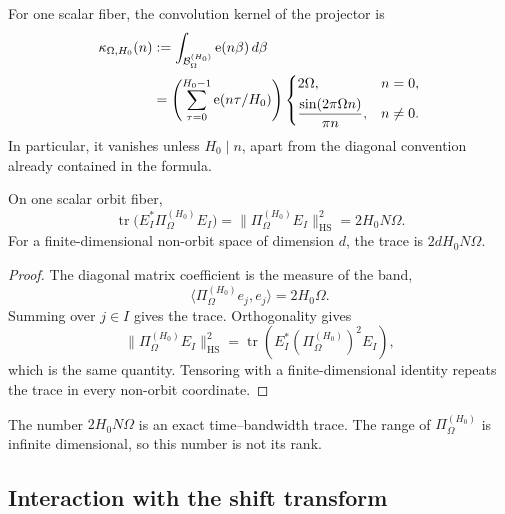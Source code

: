 For one scalar fiber, the convolution kernel of the projector is
\begin{align}
 \kappa_{\Omega,H_0}(n)
 &:=\int_{\mathcal B_{\Omega}^{(H_0)}}\mathrm e(n\beta)\,d\beta
 \notag\\
 &=\left(\sum_{\tau=0}^{H_0-1}\mathrm e(n\tau/H_0)\right)
 \begin{cases}
 2\Omega,&n=0,\\[3pt]
 \displaystyle\frac{\sin(2\pi\Omega n)}{\pi n},&n\ne0.
 \end{cases}
 \label{eq:tpc47-comb-sinc-kernel}
\end{align}
In particular, it vanishes unless \(H_0\mid n\), apart from the
diagonal convention already contained in the formula.

\begin{theorem}
\label{thm:tpc47-time-bandwidth-trace}
On one scalar orbit fiber,
\begin{equation}
 \boxed{
 \operatorname{tr}
 \bigl(E_I^*\Pi_{\Omega}^{(H_0)}E_I\bigr)
 =\|\Pi_{\Omega}^{(H_0)}E_I\|_{\mathrm{HS}}^2
 =2H_0N\Omega.}
 \label{eq:tpc47-time-bandwidth-trace}
\end{equation}
For a finite-dimensional non-orbit space of dimension \(d\), the trace
is \(2dH_0N\Omega\).
\end{theorem}

\begin{proof}
The diagonal matrix coefficient is the measure of the band,
\[
 \langle\Pi_{\Omega}^{(H_0)}e_j,e_j\rangle
 =2H_0\Omega.
\]
Summing over \(j\in I\) gives the trace.  Orthogonality gives
\[
 \|\Pi_{\Omega}^{(H_0)}E_I\|_{\mathrm{HS}}^2
 =\operatorname{tr}
 (E_I^*(\Pi_{\Omega}^{(H_0)})^2E_I),
\]
which is the same quantity.  Tensoring with a finite-dimensional
identity repeats the trace in every non-orbit coordinate.
\end{proof}

The number \(2H_0N\Omega\) is an exact time--bandwidth trace.  The
range of \(\Pi_{\Omega}^{(H_0)}\) is infinite dimensional, so this
number is not its rank.

\subsection{Interaction with the shift transform}

